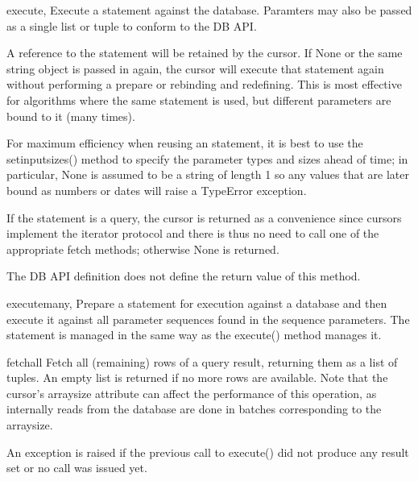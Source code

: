\documentclass{manual}
\begin{document}
\begin{funcdesc}{execute}{, {}}
  Execute a statement against the database. Paramters may also be passed as a
  single list or tuple to conform to the DB API.

  A reference to the statement will be retained by the cursor. If None or the
  same string object is passed in again, the cursor will execute that
  statement again without performing a prepare or rebinding and redefining.
  This is most effective for algorithms where the same statement is used, but
  different parameters are bound to it (many times).

  For maximum efficiency when reusing an statement, it is best to use the
  setinputsizes() method to specify the parameter types and sizes ahead of
  time; in particular, None is assumed to be a string of length 1 so any
  values that are later bound as numbers or dates will raise a TypeError
  exception.

  If the statement is a query, the cursor is returned as a convenience since
  cursors implement the iterator protocol and there is thus no need to call
  one of the appropriate fetch methods; otherwise None is returned.

   The DB API definition does not define the return value of this
  method.
\end{funcdesc}

\begin{funcdesc}{executemany}{, }
  Prepare a statement for execution against a database and then execute it
  against all parameter sequences found in the sequence parameters. The
  statement is managed in the same way as the execute() method manages it.
\end{funcdesc}

\begin{funcdesc}{fetchall}{}
  Fetch all (remaining) rows of a query result, returning them as a list of
  tuples. An empty list is returned if no more rows are available. Note that
  the cursor's arraysize attribute can affect the performance of this
  operation, as internally reads from the database are done in batches
  corresponding to the arraysize.

  An exception is raised if the previous call to execute() did not produce any
  result set or no call was issued yet.
\end{funcdesc}
\end{document}
